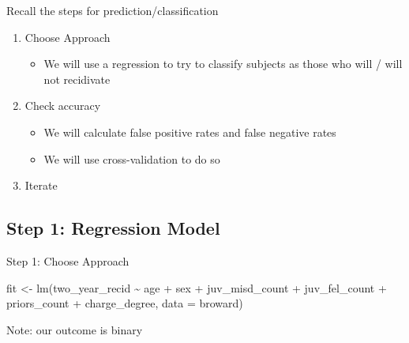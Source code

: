 \documentclass[
  letterpaper,
  DIV=11,
  numbers=noendperiod]{scrreprt}
\newenvironment{Shaded}{\begin{snugshade}}{\end{snugshade}}
\newcommand{\AttributeTok}[1]{\textcolor[rgb]{0.40,0.45,0.13}{#1}}
\newcommand{\FunctionTok}[1]{\textcolor[rgb]{0.28,0.35,0.67}{#1}}
\newcommand{\NormalTok}[1]{\textcolor[rgb]{0.00,0.23,0.31}{#1}}
\newcommand{\OtherTok}[1]{\textcolor[rgb]{0.00,0.23,0.31}{#1}}
\newcommand{\SpecialCharTok}[1]{\textcolor[rgb]{0.37,0.37,0.37}{#1}}
\providecommand{\tightlist}{%
  \setlength{\itemsep}{0pt}\setlength{\parskip}{0pt}}\usepackage{longtable,booktabs,array}
\begin{document}
Recall the steps for prediction/classification

\begin{enumerate}
\def\labelenumi{\arabic{enumi}.}
\tightlist
\item
  Choose Approach

  \begin{itemize}
  \tightlist
  \item
    We will use a regression to try to classify subjects as those who
    will / will not recidivate
  \end{itemize}
\item
  Check accuracy

  \begin{itemize}
  \tightlist
  \item
    We will calculate false positive rates and false negative rates
  \item
    We will use cross-validation to do so
  \end{itemize}
\item
  Iterate
\end{enumerate}

\hypertarget{step-1-regression-model}{%
\subsection{Step 1: Regression Model}\label{step-1-regression-model}}

Step 1: Choose Approach

\begin{Shaded}
\begin{Highlighting}[]
\NormalTok{fit }\OtherTok{\textless{}{-}} \FunctionTok{lm}\NormalTok{(two\_year\_recid }\SpecialCharTok{\textasciitilde{}}\NormalTok{ age }\SpecialCharTok{+}\NormalTok{ sex }\SpecialCharTok{+}\NormalTok{ juv\_misd\_count }\SpecialCharTok{+}\NormalTok{ juv\_fel\_count }\SpecialCharTok{+} 
\NormalTok{            priors\_count }\SpecialCharTok{+}\NormalTok{ charge\_degree, }
          \AttributeTok{data =}\NormalTok{ broward)}
\end{Highlighting}
\end{Shaded}

Note: our outcome is binary

\begin{Shaded}
\end{Shaded}
\end{document}
